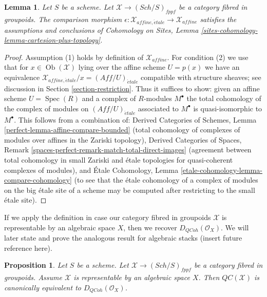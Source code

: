 \documentclass{stacks-project}
\theoremstyle{plain}
\newtheorem{proposition}[subsection]{Proposition}
\newtheorem{lemma}[subsection]{Lemma}
\theoremstyle{definition}
\theoremstyle{remark}
\numberwithin{equation}{subsection}
\def\Spec{\mathop{\mathrm{Spec}}}
\def\Sch{\mathit{Sch}}
\def\Ob{\mathop{\mathrm{Ob}}\nolimits}
\def\etale{{\acute{e}tale}}
\def\QCoh{\mathit{QCoh}}
\begin{document}
\begin{lemma}
\label{lemma-QC-compare}
Let $S$ be a scheme. Let $\mathcal{X} \to (\Sch/S)_{fppf}$ be a category
fibred in groupoids. The comparison morphism
$\epsilon : \mathcal{X}_{affine, \etale} \to \mathcal{X}_{affine}$
satisfies the assumptions and conclusions of Cohomology on Sites, Lemma
\ref{sites-cohomology-lemma-cartesion-plus-topology}.
\end{lemma}

\begin{proof}
Assumption (1) holds by definition of $\mathcal{X}_{affine}$.
For condition (2) we use that for $x \in \Ob(\mathcal{X})$
lying over the affine scheme $U = p(x)$ we have an equivalence
$\mathcal{X}_{affine, \etale}/x = (\textit{Aff}/U)_\etale$ compatible
with structure sheaves; see
discussion in Section \ref{section-restriction}.
Thus it suffices to show: given an affine scheme $U = \Spec(R)$
and a complex of $R$-modules $M^\bullet$ the total cohomology
of the complex of modules on $(\textit{Aff}/U)_\etale$
associated to $M^\bullet$ is quasi-isomorphic to $M^\bullet$.
This follows from a combination of:
Derived Categories of Schemes, Lemma
\ref{perfect-lemma-affine-compare-bounded} (total cohomology of complexes
of modules over affines in the Zariski topology),
Derived Categories of Spaces, Remark
\ref{spaces-perfect-remark-match-total-direct-images}
(agreement between total cohomology in small
Zariski and \'etale topologies for
quasi-coherent complexes of modules), and
\'Etale Cohomology, Lemma \ref{etale-cohomology-lemma-compare-cohomology}
(to see that the \'etale cohomology of a complex of modules
on the big \'etale site of a scheme
may be computed after restricting to the small \'etale site).
\end{proof}

\noindent
If we apply the definition in case our category fibred in groupoids
$\mathcal{X}$ is representable by an algebraic space $X$, then we
recover $D_\QCoh(\mathcal{O}_X)$. We will later state and prove the
analogous result for algebraic stacks (insert future reference here).

\begin{proposition}
\label{proposition-QC-compare}
Let $S$ be a scheme. Let $\mathcal{X} \to (\Sch/S)_{fppf}$ be a category
fibred in groupoids. Assume $\mathcal{X}$ is representable by an algebraic
space $X$. Then $\mathit{QC}(\mathcal{X})$ is canonically equivalent to
$D_\QCoh(\mathcal{O}_X)$.
\end{proposition}
\end{document}
